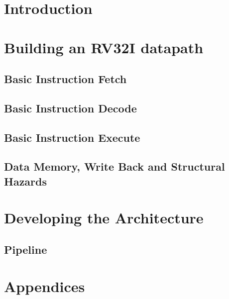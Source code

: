 \documentclass[a4paper]{book}
\begin{document}
\frontmatter
\maketitle

\tableofcontents

\let\cleardoublepage\clearpage
\mainmatter
\chapter{Introduction}


\chapter{Building an RV32I datapath}
\section{Basic Instruction Fetch}


\section{Basic Instruction Decode}


\section{Basic Instruction Execute}


\section{Data Memory, Write Back and Structural Hazards}


\chapter{Developing the Architecture}

\section{Pipeline}




\chapter{Appendices}

 


\let\cleardoublepage\clearpage
\end{document}
